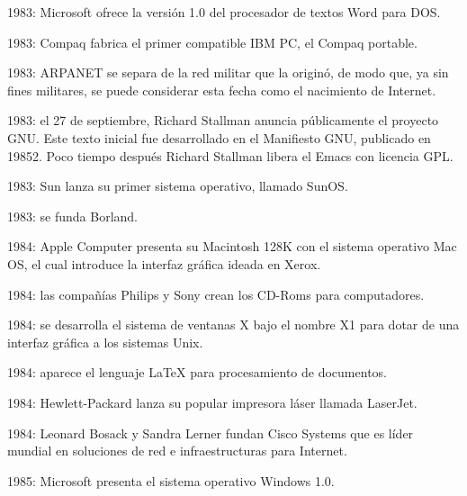 \documentclass{article}
\begin{document}
{    \item 1983: Microsoft ofrece la versión 1.0 del procesador de textos Word para DOS.
    \item 1983: Compaq fabrica el primer compatible IBM PC, el Compaq portable.
    \item 1983: ARPANET se separa de la red militar que la originó, de modo que, ya sin fines militares, se puede considerar esta fecha como el nacimiento de Internet.
    \item 1983: el 27 de septiembre, Richard Stallman anuncia públicamente el proyecto GNU. Este texto inicial fue desarrollado en el Manifiesto GNU, publicado en 19852​. Poco tiempo después Richard Stallman libera el Emacs con licencia GPL.
    \item 1983: Sun lanza su primer sistema operativo, llamado SunOS.
    \item 1983: se funda Borland.
    \item 1984: Apple Computer presenta su Macintosh 128K con el sistema operativo Mac OS, el cual introduce la interfaz gráfica ideada en Xerox.
    \item 1984: las compañías Philips y Sony crean los CD-Roms para computadores.
    \item 1984: se desarrolla el sistema de ventanas X bajo el nombre X1 para dotar de una interfaz gráfica a los sistemas Unix.
    \item 1984: aparece el lenguaje LaTeX para procesamiento de documentos.
    \item 1984: Hewlett-Packard lanza su popular impresora láser llamada LaserJet.
    \item 1984: Leonard Bosack y Sandra Lerner fundan Cisco Systems que es líder mundial en soluciones de red e infraestructuras para Internet.
    \item 1985: Microsoft presenta el sistema operativo Windows 1.0.
}
\end{document}
